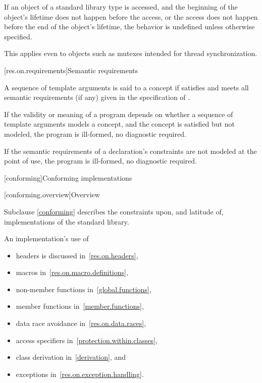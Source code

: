 \pnum
If an object of a standard library type is accessed, and
the beginning of the object's lifetime
does not happen before the access, or
the access does not happen before the end of the object's lifetime,
the behavior is undefined unless otherwise specified.
\begin{note}
This applies even to objects such as mutexes intended for thread synchronization.
\end{note}

[res.on.requirements]{Semantic requirements}

\pnum
A sequence  of template arguments is said to
%
 a concept 
if 
satisfies  and
meets all semantic requirements (if any)
given in the specification of .

\pnum
If the validity or meaning of a program
depends on whether a sequence of template arguments models a concept, and
the concept is satisfied but not modeled,
the program is ill-formed, no diagnostic required.

\pnum
If the semantic requirements of a declaration's
constraints are not modeled at the point of use,
the program is ill-formed, no diagnostic required.

[conforming]{Conforming implementations}

[conforming.overview]{Overview}

\pnum
Subclause \ref{conforming} describes the constraints upon, and latitude of, implementations of the \Cpp{} standard library.

\pnum
An implementation's use of
\begin{itemize}
\item headers is discussed in~\ref{res.on.headers},
\item macros in~\ref{res.on.macro.definitions},
\item non-member functions in~\ref{global.functions},
\item member functions in~\ref{member.functions},
\item data race avoidance in~\ref{res.on.data.races},
\item access specifiers in~\ref{protection.within.classes},
\item class derivation in~\ref{derivation}, and
\item exceptions in~\ref{res.on.exception.handling}.
\end{itemize}

